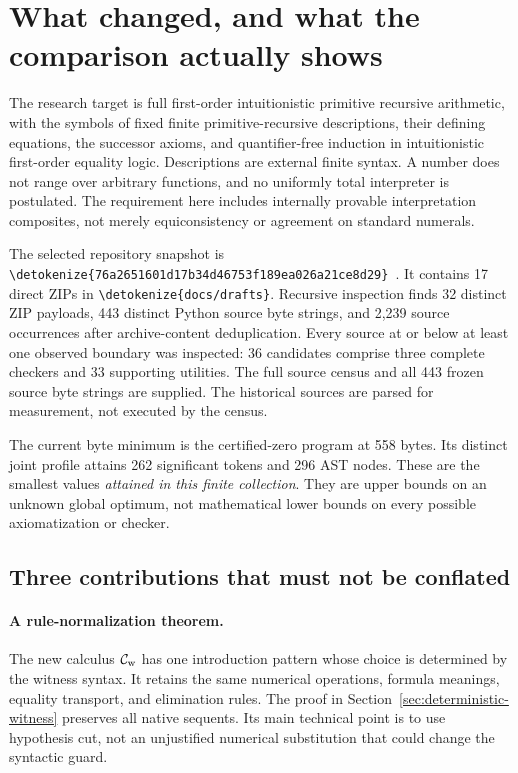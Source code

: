 \documentclass[11pt,letterpaper]{article}
\theoremstyle{definition}\newtheorem{definition}[theorem]{Definition}
\theoremstyle{remark}\newtheorem{remark}[theorem]{Remark}
\newcommand{\file}[1]{\expandafter\nolinkurl\expandafter{\detokenize{#1}}}
\begin{document}
\section{What changed, and what the comparison actually shows}
\label{sec:overview}

The research target is full first-order intuitionistic primitive recursive
arithmetic, with the symbols of fixed finite primitive-recursive
descriptions, their defining equations, the successor axioms, and
quantifier-free induction in intuitionistic first-order equality logic.
Descriptions are external finite syntax. A number does not range over
arbitrary functions, and no uniformly total interpreter is postulated.
The requirement here includes internally provable interpretation
composites, not merely equiconsistency or agreement on standard numerals.

The selected repository snapshot is
\file{76a2651601d17b34d46753f189ea026a21ce8d29}~\cite{snapshot}.
It contains 17 direct ZIPs in \file{docs/drafts}. Recursive inspection
finds 32 distinct ZIP payloads, 443 distinct Python source byte strings,
and 2,239 source occurrences after archive-content deduplication.
Every source at or below at least one observed boundary was inspected:
36 candidates comprise three complete checkers and 33 supporting utilities.
The full source census and all 443 frozen source byte strings are supplied.
The historical sources are parsed for measurement, not executed by the census.

The current byte minimum is the certified-zero program at 558 bytes.
Its distinct joint profile attains 262 significant tokens and 296 AST nodes.
These are the smallest values \emph{attained in this finite collection}.
They are upper bounds on an unknown global optimum, not mathematical
lower bounds on every possible axiomatization or checker.

\subsection{Three contributions that must not be conflated}

\paragraph{A rule-normalization theorem.}
The new calculus $\mathcal C_{\rm w}$ has one introduction pattern whose
choice is determined by the witness syntax. It retains the same numerical
operations, formula meanings, equality transport, and elimination rules.
The proof in Section~\ref{sec:deterministic-witness} preserves all native
sequents. Its main technical point is to use hypothesis cut, not an
unjustified numerical substitution that could change the syntactic guard.
\end{document}
